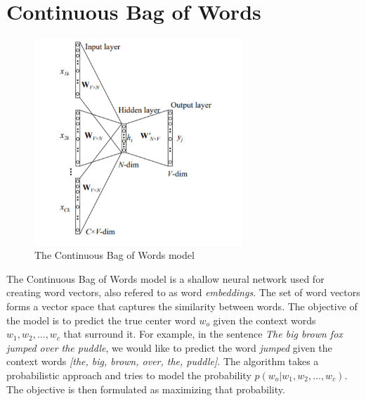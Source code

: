 \documentclass[english]{lni}
\begin{document}
\section{Continuous Bag of Words}
\begin{figure}[H]
    \centering
    \includegraphics[width=0.70\textwidth]{images/word2vec-arch.PNG}
    \caption{The Continuous Bag of Words model}
    \label{fig:word2vec-arch}
\end{figure}
The Continuous Bag of Words model is a shallow neural network used for creating word vectors, also refered to as word \textit{embeddings}. 
The set of word vectors forms a vector space that captures the similarity between words. 
The objective of the model is to predict the true center word $w_o$ given the context words $w_{1}, w_{2},\hdots, w_{c}$ that surround it. 
For example, in the sentence \textit{The big brown fox jumped over the puddle}, we would like to predict the word \textit{jumped} given 
the context words \textit{[the, big, brown, over, the, puddle]}.
The algorithm takes a probabilistic approach and tries to model the probability $p(w_{o}|w_{1}, w_{2},\hdots, w_{c})$. 
The objective is then formulated as maximizing that probability.\\
\end{document}
